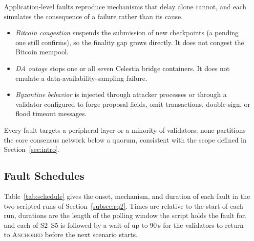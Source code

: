 Application-level faults reproduce mechanisms that delay alone cannot, and
each simulates the consequence of a failure rather than its cause.
\begin{itemize}
  \item \emph{Bitcoin congestion} suspends the submission of new
  checkpoints (a pending one still confirms), so the finality gap grows
  directly. It does not congest the Bitcoin mempool.
  \item \emph{DA outage} stops one or all seven Celestia bridge containers.
  It does not emulate a data-availability-sampling failure.
  \item \emph{Byzantine behavior} is injected through attacker processes or
  through a validator configured to forge proposal fields, omit
  transactions, double-sign, or flood timeout messages.
\end{itemize}
Every fault targets a peripheral layer or a minority of validators; none
partitions the core consensus network below a quorum, consistent with the
scope defined in Section~\ref{sec:intro}.

\subsection{Fault Schedules}
\label{subsec:schedules}

Table~\ref{tab:schedule} gives the onset, mechanism, and duration of each
fault in the two scripted runs of Section~\ref{subsec:rq2}. Times are
relative to the start of each run, durations are the length of the polling
window the script holds the fault for, and each of S2--S5 is followed by a
wait of up to 90\,s for the validators to return to \textsc{Anchored} before
the next scenario starts.

